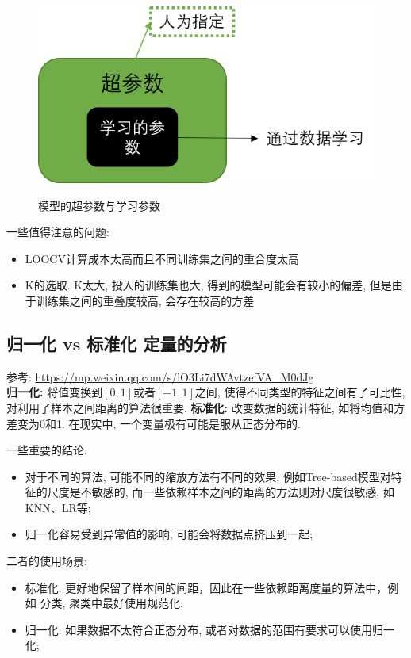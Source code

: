 \begin{figure}[h]
	\centering
	\includegraphics[width=.5\textwidth]{pics/model.png}
	\label{fig:model}
	\caption{模型的超参数与学习参数}
\end{figure}

一些值得注意的问题: 
\begin{itemize}
	\item LOOCV计算成本太高而且不同训练集之间的重合度太高
	\item K的选取. K太大, 投入的训练集也大, 得到的模型可能会有较小的偏差, 但是由于训练集之间的重叠度较高, 会存在较高的方差
\end{itemize}

\subsection{归一化 vs 标准化 定量的分析}
参考: \href{https://mp.weixin.qq.com/s/lO3Li7dWAvtzefVA_M0dJg}{https://mp.weixin.qq.com/s/lO3Li7dWAvtzefVA\_M0dJg}\\
\textbf{归一化: }将值变换到$[0, 1]$或者$[-1, 1]$之间, 使得不同类型的特征之间有了可比性, 对利用了样本之间距离的算法很重要. \textbf{标准化: }改变数据的统计特征, 如将均值和方差变为0和1. 在现实中, 一个变量极有可能是服从正态分布的. 


一些重要的结论: 
\begin{itemize}
	\item 对于不同的算法, 可能不同的缩放方法有不同的效果, 例如Tree-based模型对特征的尺度是不敏感的, 而一些依赖样本之间的距离的方法则对尺度很敏感, 如KNN、LR等; 
	
	\item 归一化容易受到异常值的影响, 可能会将数据点挤压到一起; 
\end{itemize}

二者的使用场景:
\begin{itemize}
	\item 标准化. 更好地保留了样本间的间距，因此在一些依赖距离度量的算法中，例如 分类, 聚类中最好使用规范化;
	
	\item 归一化. 如果数据不太符合正态分布, 或者对数据的范围有要求可以使用归一化;
\end{itemize}

